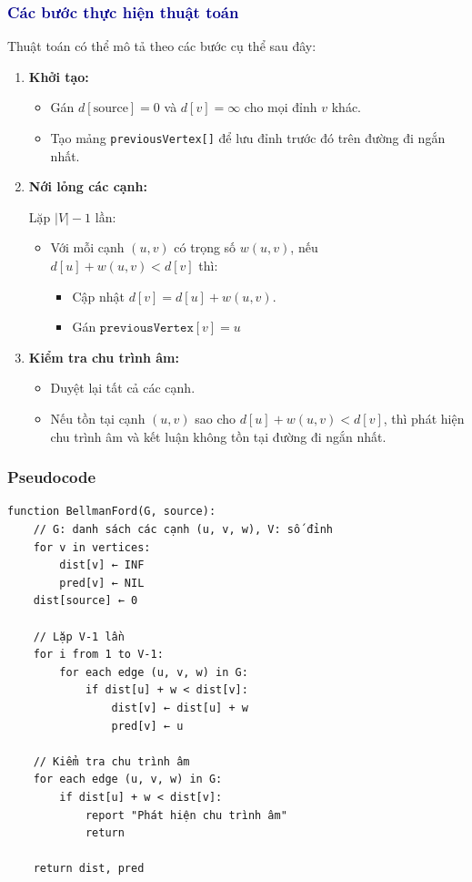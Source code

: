 \documentclass[14pt,a4paper]{report}
\begin{document}
\subsubsection{\textcolor{darkblue}{Các bước thực hiện thuật toán}}

Thuật toán có thể mô tả theo các bước cụ thể sau đây:

\begin{enumerate}
    \item \textbf{Khởi tạo:}
    \begin{itemize}
        \item Gán $d[\text{source}] = 0$ và $d[v] = \infty$ cho mọi đỉnh $v$ khác.
        \item Tạo mảng \texttt{previousVertex[]} để lưu đỉnh trước đó trên đường đi ngắn nhất.
    \end{itemize}

    \item \textbf{Nới lỏng các cạnh:}
    
    Lặp $|V|-1$ lần:
    \begin{itemize}
        \item Với mỗi cạnh $(u,v)$ có trọng số $w(u,v)$, nếu $d[u] + w(u,v) < d[v]$ thì:
        \begin{itemize}
            \item Cập nhật $d[v] = d[u] + w(u,v)$.
            \item Gán $\texttt{previousVertex}[v] = u$ 
        \end{itemize}
    \end{itemize}

    \item \textbf{Kiểm tra chu trình âm:}
    \begin{itemize}
        \item Duyệt lại tất cả các cạnh.
        \item Nếu tồn tại cạnh $(u,v)$ sao cho $d[u] + w(u,v) < d[v]$, thì phát hiện chu trình âm và kết luận không tồn tại đường đi ngắn nhất.
    \end{itemize}
\end{enumerate}

\subsubsection{Pseudocode}
\begin{verbatim}
function BellmanFord(G, source):
    // G: danh sách các cạnh (u, v, w), V: số đỉnh
    for v in vertices:
        dist[v] ← INF
        pred[v] ← NIL
    dist[source] ← 0

    // Lặp V-1 lần
    for i from 1 to V-1:
        for each edge (u, v, w) in G:
            if dist[u] + w < dist[v]:
                dist[v] ← dist[u] + w
                pred[v] ← u

    // Kiểm tra chu trình âm
    for each edge (u, v, w) in G:
        if dist[u] + w < dist[v]:
            report "Phát hiện chu trình âm"
            return

    return dist, pred

\end{verbatim}
\end{document}
